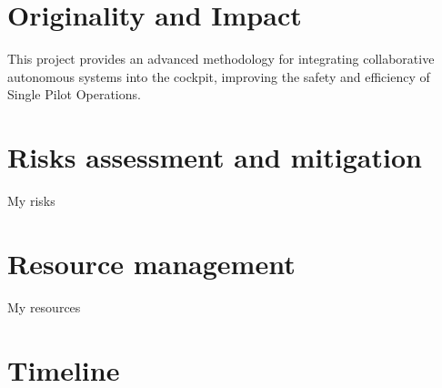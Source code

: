 \documentclass[12pt,a4paper]{article} %
\begin{document}
	\section{Originality and Impact} %
	This project provides an advanced methodology for integrating collaborative autonomous systems into the cockpit, improving the safety and efficiency of Single Pilot Operations.
	
	\section{Risks assessment and mitigation}
	My risks
	
	\section{Resource management}
	My resources
	
	\section{Timeline}
	\printbibliography %
	
\end{document}
